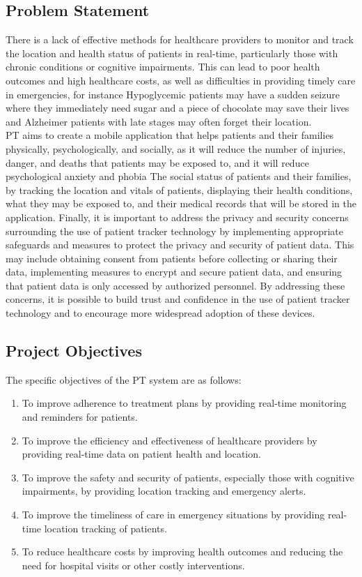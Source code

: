 \documentclass[12pt]{article}
\begin{document}
		\subsection{Problem Statement}
			
			\quad There is a lack of effective methods for healthcare providers to monitor and track the location and health status of patients in real-time, particularly those with chronic conditions or cognitive impairments. This can lead to poor health outcomes and high healthcare costs, as well as difficulties in providing timely care in emergencies, for instance Hypoglycemic patients may have a sudden seizure where they immediately need sugar and a piece of chocolate may save their lives and Alzheimer patients with late stages may often forget their location.\\
			
			PT aims to create a mobile application that helps patients and their families physically, psychologically, and socially, as it will reduce the number of injuries, danger, and deaths that patients may be exposed to, and it will reduce psychological anxiety and phobia The social status of patients and their families, by tracking the location and vitals of patients, displaying their health conditions, what they may be exposed to, and their medical records that will be stored in the application. Finally, it is important to address the privacy and security concerns surrounding the use of patient tracker technology by implementing appropriate safeguards and measures to protect the privacy and security of patient data. This may include obtaining consent from patients before collecting or sharing their data, implementing measures to encrypt and secure patient data, and ensuring that patient data is only accessed by authorized personnel. By addressing these concerns, it is possible to build trust and confidence in the use of patient tracker technology and to encourage more widespread adoption of these devices.
			
		\subsection{Project Objectives}
		The specific objectives of the PT system are as follows:
		\begin{enumerate}
			\item To improve adherence to treatment plans by providing real-time monitoring and reminders for patients.
			\item To improve the efficiency and effectiveness of healthcare providers by providing real-time data on patient health and location.
			\item To improve the safety and security of patients, especially those with cognitive impairments, by providing location tracking and emergency alerts.
			\item To improve the timeliness of care in emergency situations by providing real-time location tracking of patients.
			\item To reduce healthcare costs by improving health outcomes and reducing the need for hospital visits or other costly interventions.
			
		\end{enumerate}
\end{document}

